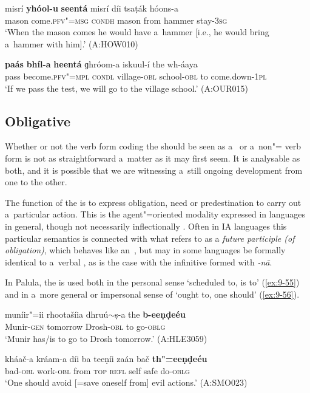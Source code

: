 \begin{exe}
\ex
\label{ex:9-53}
\gll misrí \textbf{yhóol-u} \textbf{seentá} misrí díi tsaṭák hóons-a \\
mason come.\textsc{pfv"=msg} \textsc{condh} mason from hammer stay-\textsc{3sg} \\
\glt `When the mason comes he would have a~hammer [i.e., he would bring a~hammer with him].' (A:HOW010)

\ex
\label{ex:9-54}
\gll \textbf{paás} \textbf{bhíl-a} \textbf{heentá}  ɡhróom-a iskuul-í the wh-áaya\\
pass become.\textsc{pfv"=mpl} \textsc{condl}  village-\textsc{obl} school-\textsc{obl} to come.down-\textsc{1pl}\\
\glt `If we pass the test, we will go to the village school.' (A:OUR015)
\end{exe}

\subsection{Obligative}
\label{subsec:9-2-3}

Whether or not the verb form coding the  should be seen as a~ or a~non"= verb form is not as straightforward a~matter as it may first seem. It is analysable as both, and it is possible that we are witnessing a~still ongoing development from one to the other. 



The function of the  is to express obligation, need or predestination to carry out a~particular action. This is the agent"=oriented modality expressed in languages in general, though not necessarily inflectionally \citep[177--187]{bybeeetal1994}. Often in IA languages this particular semantics is connected with what \citet[322]{masica1991} refers to as a \textit{future  participle (of obligation)}, which behaves like an~, but may in some languages be formally identical to a~verbal , as is the case with the \iliUrduHindi infinitive formed with \textit{-nā}. 



In Palula, the  is used both in the personal sense `scheduled to, is to' (\ref{ex:9-55}) and in a~more general or impersonal sense of `ought to, one should' (\ref{ex:9-56}).

\begin{exe}
\ex
\label{ex:9-55}
\gll muníir"=ii rhootašíia dhruú$\sim$ṣ-a the \textbf{b-eeṇḍeéu} \\
Munir-\textsc{gen } tomorrow Drosh-\textsc{obl} to go-\textsc{oblg} \\
\glt `Munir has/is to go to Drosh tomorrow.' (A:HLE3059)

\ex
\label{ex:9-56}
\gll kháač-a kráam-a díi ba teeṇíi zaán bač \textbf{th"=eeṇḍeéu} \\
bad-\textsc{obl} work-\textsc{obl} from \textsc{top} \textsc{refl} self safe do-\textsc{oblg} \\
\glt `One should avoid [=save oneself from] evil actions.' (A:SMO023)
\end{exe}

